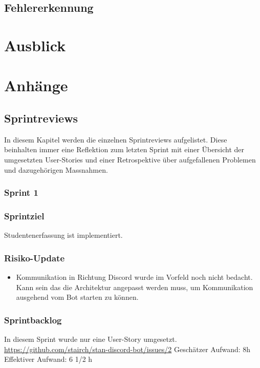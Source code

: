\documentclass[a4paper, table]{article}
\begin{document}

\subsection{Fehlererkennung}

\section{Ausblick}


\newpage

\section{Anh\"ange}

\subsection{Sprintreviews}\label{Sprintreviews}
In diesem Kapitel werden die einzelnen Sprintreviews aufgelistet.
Diese beinhalten immer eine Reflektion zum letzten Sprint mit einer Übersicht der umgesetzten User-Stories und
einer Retrospektive über aufgefallenen Problemen und dazugehörigen Massnahmen.

\subsubsection{Sprint 1}
\subsubsection*{Sprintziel}
Studentenerfassung ist implementiert.

\subsubsection*{Risiko-Update}
\begin{itemize}
    \item Kommunikation in Richtung Discord wurde im Vorfeld noch nicht bedacht.
    Kann sein das die Architektur angepasst werden muss, um Kommunikation ausgehend vom Bot starten zu können.
\end{itemize}

\subsubsection*{Sprintbacklog}
In diesem Sprint wurde nur eine User-Story umgesetzt.\\
\url{https://github.com/stairch/stan-discord-bot/issues/2}
\newline
Geschätzer Aufwand: 8h
\newline
Effektiver Aufwand: 6 1/2 h
\end{document}
